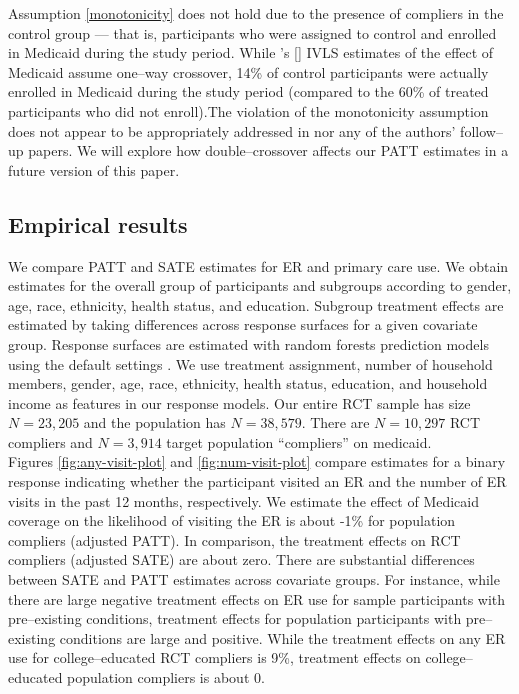 \documentclass[12pt]{article}
\newcommand{\possessivecite}[1]{\citeauthor{#1}'s [\citeyear{#1}]}
\begin{document}
Assumption \ref{monotonicity} does not hold due to the presence of compliers in the control group --- that is, participants who were assigned to control and enrolled in Medicaid during the study period. While \possessivecite{finkelstein2012} IVLS estimates of the effect of Medicaid assume one--way crossover, 14\% of control participants were actually enrolled in Medicaid during the study period (compared to the 60\% of treated participants who did not enroll).The violation of the monotonicity assumption does not appear to be appropriately addressed in \citet{finkelstein2012} nor any of the authors' follow--up papers. We will explore how double--crossover affects our PATT estimates in a future version of this paper. 

\subsection{Empirical results}

We compare PATT and SATE estimates for ER and primary care use. We obtain estimates for the overall group of participants and subgroups according to gender, age, race, ethnicity, health status, and education. Subgroup treatment effects are estimated by taking differences across response surfaces for a given covariate group. Response surfaces are estimated with random forests prediction models using the default settings \citep{breiman2001}. We use treatment assignment, number of household members, gender, age, race, ethnicity, health status, education, and household income as features in our response models. Our entire RCT sample has size $N=23,205$ and the population has $N=38,579$. There are $N=10,297$ RCT compliers and $N=3,914$ target population ``compliers'' on medicaid. \\

Figures \ref{fig:any-visit-plot} and \ref{fig:num-visit-plot} compare estimates for a binary response indicating whether the participant visited an ER and the number of ER visits in the past 12 months, respectively. We estimate the effect of Medicaid coverage on the likelihood of visiting the ER is about -1\% for population compliers (adjusted PATT). In comparison, the treatment effects on RCT compliers (adjusted SATE) are about zero. There are substantial differences between SATE and PATT estimates across covariate groups. For instance, while there are large negative treatment effects on ER use for sample participants with pre--existing conditions, treatment effects for population participants with pre--existing conditions are large and positive. While the treatment effects on any ER use for college--educated RCT compliers is 9\%, treatment effects on college--educated population compliers is about 0. \\
\end{document}
